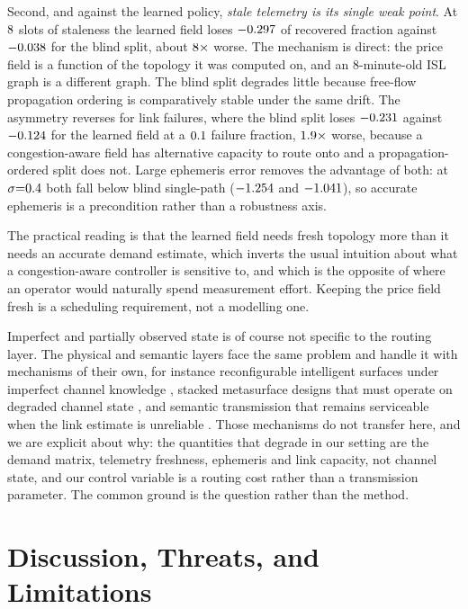 \documentclass[journal]{IEEEtran}
\begin{document}
Second, and against the learned policy, \emph{stale telemetry is its single weak point}. At
$8$ slots of staleness the learned field loses $-0.297$ of recovered
fraction against $-0.038$ for the blind split, about $8\times$ worse. The
mechanism is direct: the price field is a function of the topology it was computed on, and an
$8$-minute-old ISL graph is a different graph. The blind split degrades little because
free-flow propagation ordering is comparatively stable under the same drift. The asymmetry
reverses for link failures, where the blind split loses $-0.231$ against
$-0.124$ for the learned field at a $0.1$ failure fraction,
$1.9\times$ worse, because a congestion-aware field has alternative capacity to
route onto and a propagation-ordered split does not. Large ephemeris error removes the
advantage of both: at $\sigma{=}0.4$ both fall below blind single-path
($-1.254$ and $-1.041$), so accurate ephemeris is a precondition rather than a
robustness axis.

The practical reading is that the learned field needs fresh topology more than it needs an
accurate demand estimate, which inverts the usual intuition about what a congestion-aware
controller is sensitive to, and which is the opposite of where an operator would naturally
spend measurement effort. Keeping the price field fresh is a scheduling requirement, not a
modelling one.

Imperfect and partially observed state is of course not specific to the routing layer. The
physical and semantic layers face the same problem and handle it with mechanisms of their
own, for instance reconfigurable intelligent surfaces under imperfect channel knowledge
\cite{sun2024ris}, stacked metasurface designs that must operate on degraded channel state
\cite{sun2026sim}, and semantic transmission that remains serviceable when the link estimate
is unreliable \cite{lin2026swipt}. Those mechanisms do not transfer here, and we are explicit
about why: the quantities that degrade in our setting are the demand matrix, telemetry
freshness, ephemeris and link capacity, not channel state, and our control variable is a
routing cost rather than a transmission parameter. The common ground is the question rather
than the method.

\section{Discussion, Threats, and Limitations}\label{sec:disc}
\end{document}

